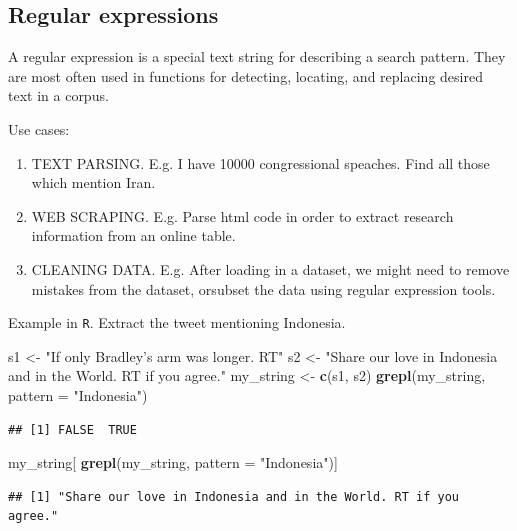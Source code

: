 \documentclass[]{book}
\newenvironment{Shaded}{\begin{snugshade}}{\end{snugshade}}
\newcommand{\DataTypeTok}[1]{\textcolor[rgb]{0.13,0.29,0.53}{#1}}
\newcommand{\KeywordTok}[1]{\textcolor[rgb]{0.13,0.29,0.53}{\textbf{#1}}}
\newcommand{\NormalTok}[1]{#1}
\newcommand{\StringTok}[1]{\textcolor[rgb]{0.31,0.60,0.02}{#1}}
\providecommand{\tightlist}{%
  \setlength{\itemsep}{0pt}\setlength{\parskip}{0pt}}
\theoremstyle{definition}
\theoremstyle{definition}
\theoremstyle{definition}
\theoremstyle{remark}
\begin{document}
\begin{Shaded}
\begin{Highlighting}[]
\begin{Shaded}
\begin{Highlighting}[]
\begin{Shaded}
\begin{Highlighting}[]
\hypertarget{regular-expressions}{%
\section{Regular expressions}\label{regular-expressions}}

A regular expression is a special text string for describing a search pattern.
They are most often used in functions for detecting, locating, and replacing desired text in a corpus.

Use cases:

\begin{enumerate}
\def\labelenumi{\arabic{enumi}.}
\tightlist
\item
  TEXT PARSING. E.g. I have 10000 congressional speaches. Find all those which mention Iran.
\item
  WEB SCRAPING. E.g. Parse html code in order to extract research information from an online table.
\item
  CLEANING DATA. E.g. After loading in a dataset, we might need to remove mistakes from the dataset, orsubset the data using regular expression tools.
\end{enumerate}

Example in \texttt{R}. Extract the tweet mentioning Indonesia.

\begin{Shaded}
\begin{Highlighting}[]
\NormalTok{s1 <-}\StringTok{ "If only Bradley's arm was longer. RT"}
\NormalTok{s2 <-}\StringTok{ "Share our love in Indonesia and in the World. RT if you agree."} 
\NormalTok{my_string <-}\StringTok{ }\KeywordTok{c}\NormalTok{(s1, s2)}
\KeywordTok{grepl}\NormalTok{(my_string, }\DataTypeTok{pattern =} \StringTok{"Indonesia"}\NormalTok{)}
\end{Highlighting}
\end{Shaded}

\begin{verbatim}
## [1] FALSE  TRUE
\end{verbatim}

\begin{Shaded}
\begin{Highlighting}[]
\NormalTok{my_string[ }\KeywordTok{grepl}\NormalTok{(my_string, }\DataTypeTok{pattern =} \StringTok{"Indonesia"}\NormalTok{)]}
\end{Highlighting}
\end{Shaded}

\begin{verbatim}
## [1] "Share our love in Indonesia and in the World. RT if you agree."
\end{verbatim}


\end{Highlighting}
\end{Shaded}
\end{Highlighting}
\end{Shaded}
\end{Highlighting}
\end{Shaded}
\end{document}
